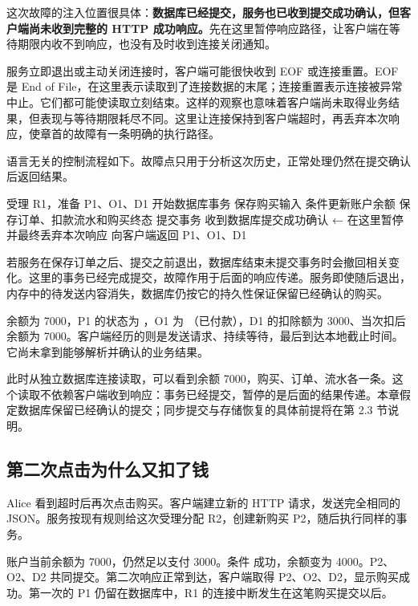 这次故障的注入位置很具体：\textbf{数据库已经提交，服务也已收到提交成功确认，但客户端尚未收到完整的 HTTP 成功响应。}先在这里暂停响应路径，让客户端在等待期限内收不到响应，也没有及时收到连接关闭通知。

服务立即退出或主动关闭连接时，客户端可能很快收到 EOF 或连接重置。EOF 是 End of File，在这里表示读取到了连接数据的末尾；连接重置表示连接被异常中止。它们都可能使读取立刻结束。这样的观察也意味着客户端尚未取得业务结果，但表现与等待期限耗尽不同。这里让连接保持到客户端超时，再丢弃本次响应，使章首的故障有一条明确的执行路径。

语言无关的控制流程如下。故障点只用于分析这次历史，正常处理仍然在提交确认后返回结果。

\begin{BookCode}
受理 R1，准备 P1、O1、D1
开始数据库事务
    保存购买输入
    条件更新账户余额
    保存订单、扣款流水和购买终态
提交事务
收到数据库提交成功确认
    ← 在这里暂停并最终丢弃本次响应
向客户端返回 P1、O1、D1
\end{BookCode}

若服务在保存订单之后、提交之前退出，数据库结束未提交事务时会撤回相关变化。这里的事务已经完成提交，故障作用于后面的响应传递。服务即使随后退出，内存中的待发送内容消失，数据库仍按它的持久性保证保留已经确认的购买。



余额为 7000，P1 的状态为 ，O1 为 （已付款），D1 的扣除额为 3000、当次扣后余额为 7000。客户端经历的则是发送请求、持续等待，最后到达本地截止时间。它尚未拿到能够解析并确认的业务结果。

此时从独立数据库连接读取，可以看到余额 7000，购买、订单、流水各一条。这个读取不依赖客户端收到响应：事务已经提交，暂停的是后面的结果传递。本章假定数据库保留已经确认的提交；同步提交与存储恢复的具体前提将在第 2.3 节说明。

\subsection*{第二次点击为什么又扣了钱}

Alice 看到超时后再次点击购买。客户端建立新的 HTTP 请求，发送完全相同的 JSON。服务按现有规则给这次受理分配 R2，创建新购买 P2，随后执行同样的事务。

账户当前余额为 7000，仍然足以支付 3000。条件  成功，余额变为 4000。P2、O2、D2 共同提交。第二次响应正常到达，客户端取得 P2、O2、D2，显示购买成功。第一次的 P1 仍留在数据库中，R1 的连接中断发生在这笔购买提交以后。

